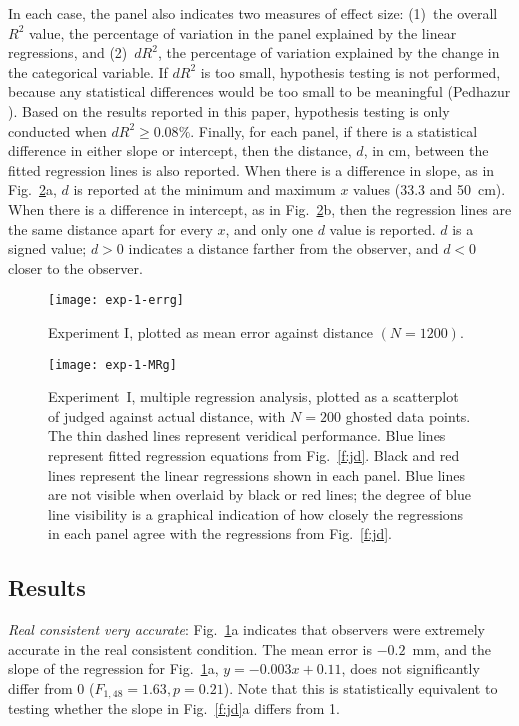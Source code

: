 \documentclass[10pt,journal,compsoc]{IEEEtran}
\newlength{\FigWidth}
\newcommand{\ParDesFirst}[1]{{\em #1}:}
\begin{document}
In each case, the panel also indicates two measures of effect size: 
(1)~the overall $R^{2}$ value, the percentage of variation in the panel explained by the linear regressions, and 
(2)~$dR^{2}$, the percentage of variation explained by the change in the categorical variable.  If $dR^{2}$ is too small, hypothesis testing is not performed, because any statistical differences would be too small to be meaningful (Pedhazur \cite{pedhazur:1982}).  Based on the results reported in this paper, hypothesis testing is only conducted when  $dR^{2} \geq 0.08\%$.
Finally, for each panel, if there is a statistical difference in either slope or intercept, then the distance, $d$, in cm, between the fitted regression lines is also reported.  When there is a difference in slope, as in Fig.~\ref{f:e1-MR}a, $d$ is reported at the minimum and maximum $x$ values (33.3 and 50~cm).  When there is a difference in intercept, as in Fig.~\ref{f:e1-MR}b, then the regression lines are the same distance apart for every $x$, and only one $d$ value is reported.  $d$ is a signed value; $d > 0$ indicates a distance farther from the observer, and $d < 0$ closer to the observer.


\begin{figure}[!t]
\centering
\texttt{[image: exp-1-errg]}
\caption{Experiment I, plotted as mean error against distance $(N = 1200)$.} 
\label{f:e1-err}
\end{figure}

\begin{figure}[!t]
\centering
\texttt{[image: exp-1-MRg]}
\caption{Experiment~I, multiple regression analysis, plotted as a scatterplot of judged against actual distance, with $N = 200$ ghosted data points.  The thin dashed lines represent veridical performance.  Blue lines represent fitted regression equations from Fig.~\ref{f:jd}.  Black and red lines represent the linear regressions shown in each panel.  Blue lines are not visible when overlaid by black or red lines; the degree of blue line visibility is a graphical indication of how closely the regressions in each panel agree with the regressions from Fig.~\ref{f:jd}.} 
\label{f:e1-MR}
\end{figure}

\subsection {Results}


\ParDesFirst{Real consistent very accurate} Fig.~\ref{f:e1-err}a indicates that observers were extremely accurate in the real consistent condition.  The mean error is $-0.2$~mm, and the slope of the regression for Fig.~\ref{f:e1-err}a, $y = -0.003x + 0.11$, does not significantly differ from 0 ($F_{1,48} = 1.63, p = 0.21$).  Note that this is statistically equivalent to testing whether the slope in Fig.~\ref{f:jd}a differs from 1. 
\end{document}
